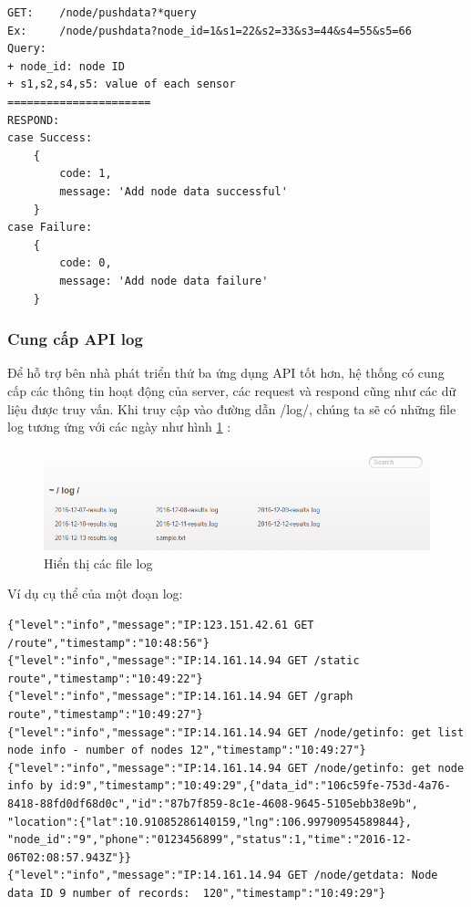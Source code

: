 \begin{lstlisting}
GET: 	/node/pushdata?*query
Ex: 	/node/pushdata?node_id=1&s1=22&s2=33&s3=44&s4=55&s5=66
Query:
+ node_id: node ID
+ s1,s2,s4,s5: value of each sensor
======================
RESPOND:
case Success:
	{
		code: 1,
		message: 'Add node data successful'
	}
case Failure:	
	{
		code: 0,
		message: 'Add node data failure'
	}
\end{lstlisting}

\subsubsection*{Cung cấp API log}

Để hỗ trợ bên nhà phát triển thứ ba ứng dụng API tốt hơn, hệ thống có cung cấp các thông tin hoạt động của server, các request và respond cũng như các dữ liệu được truy vấn. Khi truy cập vào đường dẫn /log/, chúng ta sẽ có những file log tương ứng với các ngày như hình \ref{fig: log} :

\begin{figure}[H]
	\centering    
	\includegraphics[width=1.0\textwidth]{log}
	\caption[Hiển thị các file log]{Hiển thị các file log}
	\label{fig: log}
\end{figure}

Ví dụ cụ thể của một đoạn log:
\begin{lstlisting}
{"level":"info","message":"IP:123.151.42.61 GET /route","timestamp":"10:48:56"}
{"level":"info","message":"IP:14.161.14.94 GET /static route","timestamp":"10:49:22"}
{"level":"info","message":"IP:14.161.14.94 GET /graph route","timestamp":"10:49:27"}
{"level":"info","message":"IP:14.161.14.94 GET /node/getinfo: get list node info - number of nodes 12","timestamp":"10:49:27"}
{"level":"info","message":"IP:14.161.14.94 GET /node/getinfo: get node info by id:9","timestamp":"10:49:29",{"data_id":"106c59fe-753d-4a76-8418-88fd0df68d0c","id":"87b7f859-8c1e-4608-9645-5105ebb38e9b", "location":{"lat":10.91085286140159,"lng":106.99790954589844}, "node_id":"9","phone":"0123456899","status":1,"time":"2016-12-06T02:08:57.943Z"}}
{"level":"info","message":"IP:14.161.14.94 GET /node/getdata: Node data ID 9 number of records:  120","timestamp":"10:49:29"}
\end{lstlisting}

